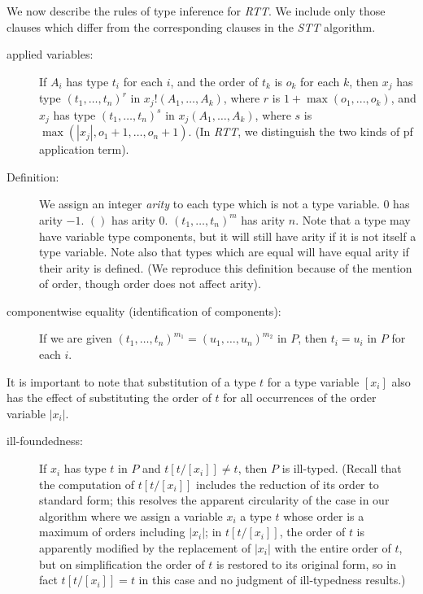 \documentclass{article}
\begin{document}
We now describe the rules of type inference for {\em RTT\/}.  We
include only those clauses which differ from the corresponding clauses
in the {\em STT\/} algorithm.

\begin{description}

\item[applied variables:] If $A_i$ has type $t_i$ for each $i$, and
the order of $t_k$ is $o_k$ for each $k$, then $x_j$ has type
$(t_1,\ldots,t_n)^r$ in $x_j!(A_1,\ldots,A_k)$, where
$r$ is $1+\max(o_1,...,o_k)$, and $x_j$ has type $(t_1,\ldots,t_n)^s$ in
$x_j(A_1,\ldots,A_k)$, where $s$ is $\max(|x_j|,o_1+1,\ldots,o_n+1)$.  (In
{\em RTT\/}, we distinguish the two kinds of pf application term).

\item[Definition:] We assign an integer {\em arity\/} to each type
which is not a type variable.  $0$ has arity $-1$.  $()$ has arity 0.
$(t_1,\ldots,t_n)^m$ has arity $n$.  Note that a type may have variable
type components, but it will still have arity if it is not itself a
type variable.  Note also that types which are equal will have equal
arity if their arity is defined.  (We reproduce this definition because
of the mention of order, though order does not affect arity).

\item[componentwise equality (identification of components):] If we are given
$(t_1,\ldots,t_n)^{m_1} = (u_1,\ldots,u_n)^{m_2}$ in $P$, then
$t_i=u_i$ in $P$ for each $i$.

\end{description}
 
It is important to note that substitution of a type $t$ for a type
variable $[x_i]$ also has the effect of substituting the order of $t$
for all occurrences of the order variable $|x_i|$.

\begin{description}

\item[ill-foundedness:] If $x_i$ has type $t$ in $P$ and $t[t/[x_i]]
\neq t$, then $P$ is ill-typed.  (Recall that the computation of
$t[t/[x_i]]$ includes the reduction of its order to standard form;
this resolves the apparent circularity of the case in our algorithm
where we assign a variable $x_i$ a type $t$ whose order is a maximum
of orders including $|x_i|$; in $t[t/[x_i]]$, the order of $t$ is
apparently modified by the replacement of $|x_i|$ with the entire
order of $t$, but on simplification the order of $t$ is restored to
its original form, so in fact $t[t/[x_i]]= t$ in this case and no
judgment of ill-typedness results.)

\end{description}
\end{document}
